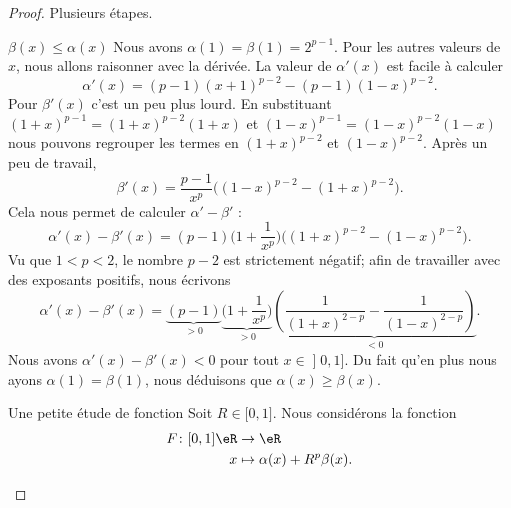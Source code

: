\begin{proof}
    Plusieurs étapes.
    \begin{subproof}
        \item[\( \beta(x)\leq \alpha(x)\)]
            Nous avons \( \alpha(1)=\beta(1)=2^{p-1}\). Pour les autres valeurs de \( x\), nous allons raisonner avec la dérivée. La valeur de \( \alpha'(x)\) est facile à calculer
            \begin{equation}
                \alpha'(x)=(p-1)(x+1)^{p-2}-(p-1)(1-x)^{p-2}.
            \end{equation}
            Pour \( \beta'(x)\) c'est un peu plus lourd. En substituant \( (1+x)^{p-1}=(1+x)^{p-2}(1+x)\) et \( (1-x)^{p-1}=(1-x)^{p-2}(1-x)\) nous pouvons regrouper les termes en \( (1+x)^{p-2}\) et \( (1-x)^{p-2}\). Après un peu de travail,
            \begin{equation}
                \beta'(x)=\frac{ p-1 }{ x^p }\big( (1-x)^{p-2}-(1+x)^{p-2} \big).
            \end{equation}
            Cela nous permet de calculer \( \alpha'-\beta'\) :
            \begin{equation}
                \alpha'(x)-\beta'(x)=(p-1)\big( 1+\frac{1}{ x^p } \big)\big( (1+x)^{p-2}-(1-x)^{p-2} \big).
            \end{equation}
            Vu que \( 1<p<2\), le nombre \( p-2\) est strictement négatif; afin de travailler avec des exposants positifs, nous écrivons
            \begin{equation}
                \alpha'(x)-\beta'(x)=\underbrace{(p-1)}_{>0}\underbrace{\big( 1+\frac{1}{ x^p } \big)}_{>0}\underbrace{\left( \frac{1}{ (1+x)^{2-p}}-\frac{1}{ (1-x)^{2-p} }  \right)}_{<0}.
            \end{equation}
            Nous avons \( \alpha'(x)-\beta'(x)<0\) pour tout \( x\in \mathopen] 0 , 1 \mathclose]\). Du fait qu'en plus nous ayons \( \alpha(1)=\beta(1)\), nous déduisons que \( \alpha(x)\geq \beta(x)\).
        \item[Une petite étude de fonction]
            Soit \( R\in \mathopen[ 0 , 1 \mathclose]\). Nous considérons la fonction
            \begin{equation}
                \begin{aligned}
                    F\colon \mathopen[ 0 , 1 \mathclose]\eR&\to \eR \\
                    x&\mapsto \alpha(x)+R^p\beta(x). 
                \end{aligned}
            \end{equation}

\end{subproof}
\end{proof}
